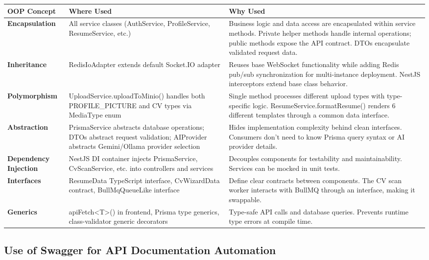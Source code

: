 \documentclass[12pt,a4paper]{report}
\begin{document}
\begin{longtable}{|p{2.5cm}|p{4.5cm}|p{5.5cm}|}
\hline
\textbf{OOP Concept} & \textbf{Where Used} & \textbf{Why Used} \\
\hline
\textbf{Encapsulation} & All service classes (AuthService, ProfileService, ResumeService, etc.) & Business logic and data access are encapsulated within service methods. Private helper methods handle internal operations; public methods expose the API contract. DTOs encapsulate validated request data. \\
\hline
\textbf{Inheritance} & RedisIoAdapter extends default Socket.IO adapter & Reuses base WebSocket functionality while adding Redis pub/sub synchronization for multi-instance deployment. NestJS interceptors extend base class behavior. \\
\hline
\textbf{Polymorphism} & UploadService.uploadToMinio() handles both PROFILE\_PICTURE and CV types via MediaType enum & Single method processes different upload types with type-specific logic. ResumeService.formatResume() renders 6 different templates through a common data interface. \\
\hline
\textbf{Abstraction} & PrismaService abstracts database operations; DTOs abstract request validation; AIProvider abstracts Gemini/Ollama provider selection & Hides implementation complexity behind clean interfaces. Consumers don't need to know Prisma query syntax or AI provider details. \\
\hline
\textbf{Dependency Injection} & NestJS DI container injects PrismaService, CvScanService, etc. into controllers and services & Decouples components for testability and maintainability. Services can be mocked in unit tests. \\
\hline
\textbf{Interfaces} & ResumeData TypeScript interface, CvWizardData contract, BullMqQueueLike interface & Define clear contracts between components. The CV scan worker interacts with BullMQ through an interface, making it swappable. \\
\hline
\textbf{Generics} & apiFetch<T>() in frontend, Prisma type generics, class-validator generic decorators & Type-safe API calls and database queries. Prevents runtime type errors at compile time. \\
\hline
\end{longtable}

\subsection{Use of Swagger for API Documentation Automation}
\end{document}
